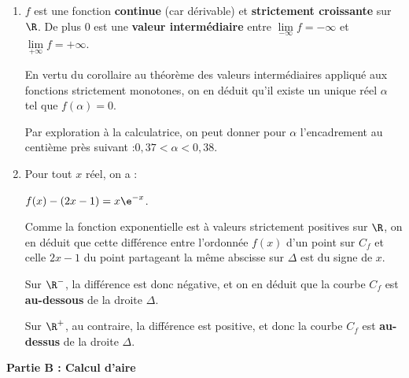 \begin{enumerate}
Le minimum de $f'$ est donc un réel supérieur à 1, donc strictement positif.

On en déduit que $f'$ est donc une fonction à valeurs strictement positives sur $\R$, en conséquence, $f$ est effectivement une fonction strictement croissante sur $\R$.

\item $f$ est une fonction \textbf{continue} (car dérivable) et \textbf{strictement croissante} sur $\R$. De plus 0 est une \textbf{valeur intermédiaire} entre $\lim\limits_{-\infty} f = -\infty$ et $\lim\limits_{+\infty} f = +\infty$.

En vertu du corollaire au théorème des valeurs intermédiaires appliqué aux fonctions strictement monotones, on en déduit qu'il existe un unique réel $\alpha$ tel que $f(\alpha)=0$.

Par exploration à la calculatrice, on peut donner pour $\alpha$ l'encadrement au centième près suivant :\quad $0,37 < \alpha < 0,38$.

\item Pour tout $x$ réel, on a :

$f(x) - (2x-1) = x\e^{-x}$.

Comme la fonction exponentielle est  à valeurs strictement positives sur $\R$, on en déduit que cette différence entre l'ordonnée $f(x)$ d'un point sur $C_f$ et celle $2x - 1$ du point partageant la même abscisse sur $\Delta$ est du signe de $x$.

Sur $\R^-$, la différence est donc négative, et on en déduit que la courbe $C_f$ est \textbf{au-dessous} de la droite $\Delta$.

Sur $\R^+$, au contraire, la différence est positive, et donc la courbe $C_f$ est \textbf{au-dessus} de la droite $\Delta$.
\end{enumerate}

\medskip

\textbf{Partie B : Calcul d'aire}

\medskip

